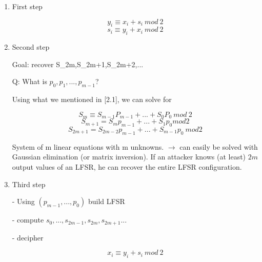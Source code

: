 \documentclass[a4paper]{article}
\begin{document}
\begin{enumerate}
    \item First step

$$y_i \equiv x_i + s_i \ mod \ 2$$
$$s_i \equiv y_i + x_i \ mod \ 2$$

\item Second step

    Goal: recover S_{2m},S_{2m+1},S_{2m+2},...

    Q: What is $p_0, p_1,...,p_{m-1}$?

    Using what we mentioned in  [2.1], we can solve for 

    $$S_m \equiv S_{m-1}P_{m-1} +  ... + S_0P_0 \ mod \ 2$$
    $$S_{m+1} = S_m p_{m-1} + ...  + S_1p_0 mod 2$$
    $$S_{2m+1} = S_{2m-2} p_{m-1} + ... + S_{m-1}p_0 \ mod 2$$

System of m linear equations with m unknowns. $\rightarrow$ can easily be solved with Gaussian elimination (or matrix inversion). If an attacker knows (at least) $2m$ output values of an LFSR, he can recover the entire LFSR configuration.

\item Third step

- Using $(p_{m-1},...,p_0)$ build LFSR

- compute $s_0,...,s_{2m-1},s_{2m},s_{2m+1}...$

- decipher


$$ x_i \equiv y_i + s_i \ mod \ 2$$
\end{enumerate}
\end{document}
